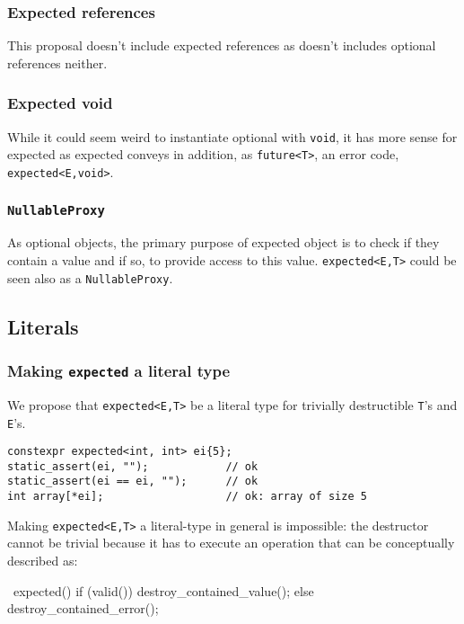 \documentclass[a4paper,10pt]{article}
\newcommand{\cpp}[1]{\lstinline{#1}}
\begin{document}
\subsubsection{Expected references}

This proposal doesn't include expected references as \cite{optional} doesn't  includes optional references neither.

\subsubsection{Expected void}

While it could seem weird to instantiate optional with \cpp{void}, it has more sense for expected as expected conveys in addition, as \cpp{future<T>},  an error code, \cpp{expected<E,void>}.

\subsubsection{\cpp{NullableProxy}}

As optional objects, the primary purpose of expected object is to check if they contain a value and if so, to provide access to this value.  \cpp{expected<E,T>} could be seen also as a \cpp{NullableProxy}.  

\subsection{Literals}

\subsubsection{Making \cpp{expected} a literal type}

We propose that \cpp{expected<E,T>} be a literal type for trivially destructible \cpp{T}'s and \cpp{E}'s.

\begin{lstlisting}
constexpr expected<int, int> ei{5};
static_assert(ei, "");            // ok
static_assert(ei == ei, "");      // ok
int array[*ei];                   // ok: array of size 5 
\end{lstlisting}

Making \cpp{expected<E,T>} a literal-type in general is impossible: the destructor cannot be trivial because it has to execute an operation that can be conceptually described as:

~expected() {
  if (valid()) destroy_contained_value();
  else destroy_contained_error();
}
\end{document}
